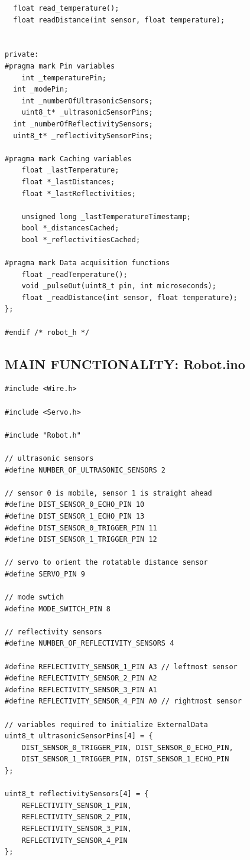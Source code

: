 \documentclass[paper=a4, fontsize=11pt]{scrartcl}
\numberwithin{equation}{section}		%
\numberwithin{figure}{section}			%
\numberwithin{table}{section}				%
\begin{document}
{\begin{verbatim}
  float read_temperature();
  float readDistance(int sensor, float temperature);

 
private:
#pragma mark Pin variables
	int _temperaturePin;
  int _modePin;
	int _numberOfUltrasonicSensors;
	uint8_t* _ultrasonicSensorPins;
  int _numberOfReflectivitySensors;
  uint8_t* _reflectivitySensorPins;
    
#pragma mark Caching variables
	float _lastTemperature;
	float *_lastDistances;
	float *_lastReflectivities;
    
	unsigned long _lastTemperatureTimestamp;
	bool *_distancesCached;
	bool *_reflectivitiesCached;
    
#pragma mark Data acquisition functions
	float _readTemperature();
	void _pulseOut(uint8_t pin, int microseconds);
	float _readDistance(int sensor, float temperature);
};

#endif /* robot_h */

\end{verbatim}

\subsection{MAIN FUNCTIONALITY: Robot.ino}
\begin{verbatim}
#include <Wire.h>

#include <Servo.h>

#include "Robot.h"

// ultrasonic sensors
#define NUMBER_OF_ULTRASONIC_SENSORS 2

// sensor 0 is mobile, sensor 1 is straight ahead
#define DIST_SENSOR_0_ECHO_PIN 10
#define DIST_SENSOR_1_ECHO_PIN 13
#define DIST_SENSOR_0_TRIGGER_PIN 11
#define DIST_SENSOR_1_TRIGGER_PIN 12

// servo to orient the rotatable distance sensor
#define SERVO_PIN 9

// mode swtich
#define MODE_SWITCH_PIN 8

// reflectivity sensors
#define NUMBER_OF_REFLECTIVITY_SENSORS 4

#define REFLECTIVITY_SENSOR_1_PIN A3 // leftmost sensor
#define REFLECTIVITY_SENSOR_2_PIN A2
#define REFLECTIVITY_SENSOR_3_PIN A1
#define REFLECTIVITY_SENSOR_4_PIN A0 // rightmost sensor

// variables required to initialize ExternalData
uint8_t ultrasonicSensorPins[4] = {
	DIST_SENSOR_0_TRIGGER_PIN, DIST_SENSOR_0_ECHO_PIN,
	DIST_SENSOR_1_TRIGGER_PIN, DIST_SENSOR_1_ECHO_PIN
};

uint8_t reflectivitySensors[4] = {
	REFLECTIVITY_SENSOR_1_PIN,
	REFLECTIVITY_SENSOR_2_PIN,
	REFLECTIVITY_SENSOR_3_PIN,
	REFLECTIVITY_SENSOR_4_PIN
};


\end{verbatim}}
\end{document}
